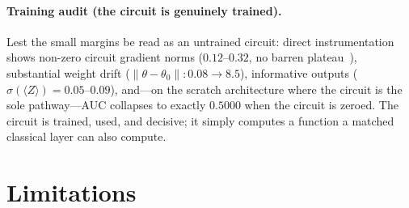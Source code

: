 \documentclass[10pt,letterpaper]{article}
\theoremstyle{plain}
\theoremstyle{definition}
\begin{document}
\paragraph{Training audit (the circuit is genuinely trained).}
Lest the small margins be read as an untrained circuit: direct instrumentation
shows non-zero circuit gradient norms ($0.12$--$0.32$, no barren
plateau~\cite{mcclean2018barren}), substantial weight drift
($\|\theta-\theta_0\|: 0.08\to8.5$), informative outputs
($\sigma(\langle Z\rangle) = 0.05$--$0.09$), and---on the scratch architecture
where the circuit is the sole pathway---AUC collapses to exactly $0.5000$ when the
circuit is zeroed. The circuit is trained, used, and decisive; it simply computes
a function a matched classical layer can also compute.

\section{Limitations}
\label{sec:limitations}
\end{document}
